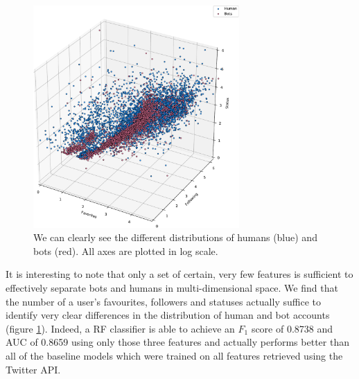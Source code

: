 \begin{figure}[t!]
    \centering
    \includegraphics[width=0.7\textwidth]{FIG/3dvis_base-crop.pdf}
    \caption{We can clearly see the different distributions of humans (blue) and bots (red). All axes are plotted in log scale.}
    \label{fig:3dvis}
\end{figure}

It is interesting to note that only a set of certain, very few features is sufficient to effectively separate bots and humans in multi-dimensional space. We find that the number of a user's favourites, followers and statuses actually suffice to identify very clear differences in the distribution of human and bot accounts (figure \ref{fig:3dvis}). Indeed, a RF classifier is able to achieve an $F_1$ score of 0.8738 and AUC of 0.8659 using only those three features and actually performs better than all of the baseline models which were trained on all features retrieved using the Twitter API.


